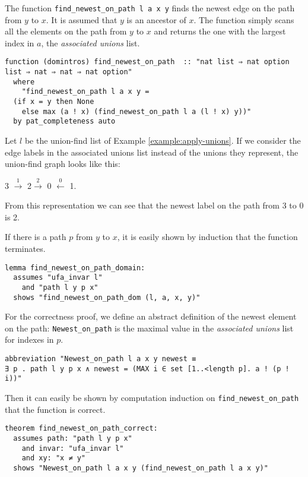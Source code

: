The function \lstinline{find_newest_on_path l a x y} finds the newest edge on the path from $y$ to $x$. It is assumed that $y$ is an ancestor of $x$. The function simply scans all the elements on the path from $y$ to $x$ and returns the one with the largest index in $a$, the \emph{associated unions} list.

\begin{lstlisting}
function (domintros) find_newest_on_path  :: "nat list ⇒ nat option list ⇒ nat ⇒ nat ⇒ nat option"
  where
    "find_newest_on_path l a x y =
  (if x = y then None
    else max (a ! x) (find_newest_on_path l a (l ! x) y))"
  by pat_completeness auto
\end{lstlisting}

\begin{exmp}
Let $l$ be the union-find list of Example \ref{example:apply-unions}. If we consider the edge labels in the associated unions list instead of the unions they represent, the union-find graph looks like this:

3 $\xrightarrow{\text{1}}$ 2$\xrightarrow{\text{2}}$ 0 $\xleftarrow{\text{0}}$ 1.

From this representation we can see that the newest label on the path from 3 to 0 is 2.
\end{exmp}

If there is a path $p$ from $y$ to $x$, it is easily shown by induction that the function terminates.

\begin{lstlisting}
lemma find_newest_on_path_domain:
  assumes "ufa_invar l"
    and "path l y p x"
  shows "find_newest_on_path_dom (l, a, x, y)"
\end{lstlisting}

For the correctness proof, we define an abstract definition of the newest element on the path: \lstinline{Newest_on_path} is the maximal value in the \emph{associated unions} list for indexes in $p$.

\begin{lstlisting}
abbreviation "Newest_on_path l a x y newest ≡
∃ p . path l y p x ∧ newest = (MAX i ∈ set [1..<length p]. a ! (p ! i))"
\end{lstlisting}

Then it can easily be shown by computation induction on \lstinline{find_newest_on_path} that the function is correct.

\begin{lstlisting}
theorem find_newest_on_path_correct:
  assumes path: "path l y p x"
    and invar: "ufa_invar l"
    and xy: "x ≠ y"
  shows "Newest_on_path l a x y (find_newest_on_path l a x y)"
\end{lstlisting}

